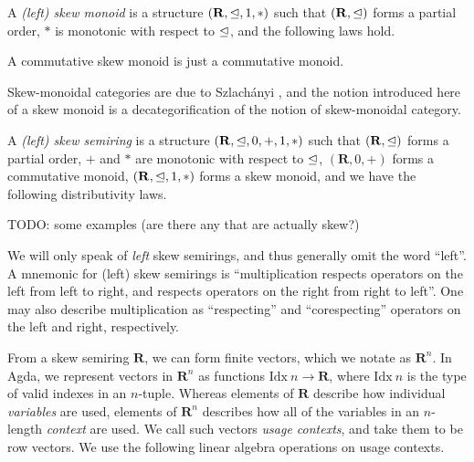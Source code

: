 \documentclass[submission,copyright,creativecommons]{eptcs}
\begin{document}
\begin{definition}
  A \emph{(left) skew monoid} is a structure $(\mathbf R, \trianglelefteq, 1, *)$ such
  that $(\mathbf R, \trianglelefteq)$ forms a partial order, $*$ is monotonic with
  respect to $\trianglelefteq$, and the following laws hold.
\end{definition}

\begin{remark}
  A commutative skew monoid is just a commutative monoid.
\end{remark}

Skew-monoidal categories are due to Szlach\'anyi \cite{skew}, and the notion
introduced here of a skew monoid is a decategorification of the notion of
skew-monoidal category.

\begin{definition}
  A \emph{(left) skew semiring} is a structure
  $(\mathbf R, \trianglelefteq, 0, +, 1, *)$ such that $(\mathbf R, \trianglelefteq)$ forms a
  partial order, $+$ and $*$ are monotonic with respect to $\trianglelefteq$,
  $(\mathbf R, 0, +)$ forms a commutative monoid, $(\mathbf R, \trianglelefteq, 1, *)$
  forms a skew monoid, and we have the following distributivity laws.
\end{definition}

\begin{example}
  TODO: some examples (are there any that are actually skew?)
\end{example}

We will only speak of \emph{left} skew semirings, and thus generally
omit the word ``left''.  A mnemonic for (left) skew semirings is
``multiplication respects operators on the left from left to right,
and respects operators on the right from right to left''.  One may
also describe multiplication as ``respecting'' and ``corespecting''
operators on the left and right, respectively.

From a skew semiring $\mathbf R$, we can form finite vectors, which we
notate as $\mathbf R^n$. In Agda, we represent vectors in
$\mathbf R^n$ as functions $\mathrm{Idx}~n \to \mathbf{R}$, where
$\mathrm{Idx}~n$ is the type of valid indexes in an $n$-tuple.
Whereas elements of $\mathbf R$ describe how individual
\emph{variables} are used, elements of $\mathbf R^n$ describes how all
of the variables in an $n$-length \emph{context} are used. We call
such vectors \emph{usage contexts}, and take them to be row vectors.
We use the following linear algebra operations on usage contexts.
\end{document}
